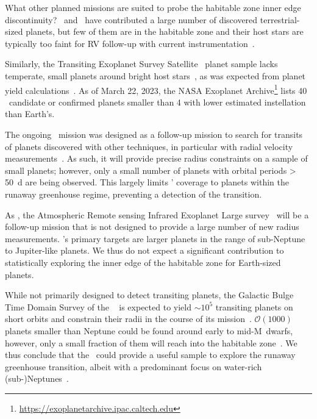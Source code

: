 \documentclass[twocolumn,twocolappendix]{aastex631}
\begin{document}
What other planned missions are suited to probe the habitable zone inner edge discontinuity?
\kepler\ and \ktwo\ have contributed a large number of discovered terrestrial-sized planets, but few of them are in the habitable zone and their host stars are typically too faint for RV follow-up with current instrumentation~\citep{Dressing2015}.

Similarly, the Transiting Exoplanet Survey Satellite~\citep[\tess,][]{Ricker2014a} planet sample lacks temperate, small planets around bright host stars~\citep{Ment2023}, as was expected from planet yield calculations~\citep{Barclay2018}.
As of March 22, 2023, the NASA Exoplanet Archive\footnote{\url{https://exoplanetarchive.ipac.caltech.edu}} lists 40 \tess\ candidate or confirmed planets smaller than \SI{4}{\rEarth} with lower estimated instellation than Earth's.

The ongoing \cheops\ mission was designed as a follow-up mission to search for transits of planets discovered with other techniques, in particular with radial velocity measurements~\citep{Benz2021}.
As such, it will provide precise radius constraints on a sample of small planets; however, only a small number of planets with orbital periods \SI{> 50}{\day} are being observed.
This largely limits \cheops' coverage to planets within the runaway greenhouse regime, preventing a detection of the transition.

As \cheops, the Atmospheric Remote sensing Infrared Exoplanet Large survey~\citep[\ariel,][]{Puig2016} will be a follow-up mission that is not designed to provide a large number of new radius measurements.
\ariel's primary targets are larger planets in the range of sub-Neptune to Jupiter-like planets.
We thus do not expect a significant contribution to statistically exploring the inner edge of the habitable zone for Earth-sized planets.

While not primarily designed to detect transiting planets, the Galactic Bulge Time Domain Survey of the \rst~\citep{Spergel2015} is expected to yield $\sim 10^5$ transiting planets on short orbits and constrain their radii in the course of its mission~\citep{Montet2017}.
$\mathcal{O} (1000)$ planets smaller than Neptune could be found around early to mid-M~dwarfs, however, only a small fraction of them will reach into the habitable zone~\citep{Tamburo2023}.
We thus conclude that the \rst\ could provide a useful sample to explore the runaway greenhouse transition, albeit with a predominant focus on water-rich (sub-)Neptunes~\citep[e.g.,][]{Pierrehumbert2022}.
\end{document}
